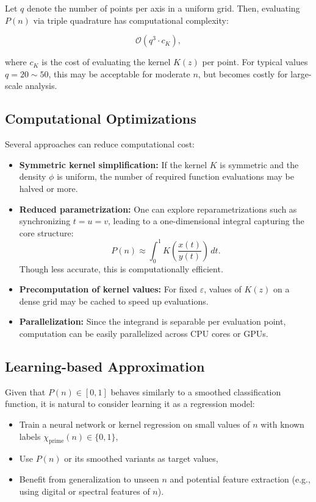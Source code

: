 \documentclass[12pt]{article}
\theoremstyle{definition}
\theoremstyle{plain}
\theoremstyle{remark}
\begin{document}
Let \( q \) denote the number of points per axis in a uniform grid. Then, evaluating \( P(n) \) via triple quadrature has computational complexity:

\[
\mathcal{O}(q^3 \cdot c_K),
\]

where \( c_K \) is the cost of evaluating the kernel \( K(z) \) per point. For typical values \( q = 20 \sim 50 \), this may be acceptable for moderate \( n \), but becomes costly for large-scale analysis.

\subsection{Computational Optimizations}

Several approaches can reduce computational cost:

\begin{itemize}
  \item \textbf{Symmetric kernel simplification:} If the kernel \( K \) is symmetric and the density \( \phi \) is uniform, the number of required function evaluations may be halved or more.
  \item \textbf{Reduced parametrization:} One can explore reparametrizations such as synchronizing \( t = u = v \), leading to a one-dimensional integral capturing the core structure:
  \[
  P(n) \approx \int_0^1 K\left( \frac{x(t)}{y(t)} \right) \, dt.
  \]
  Though less accurate, this is computationally efficient.
  \item \textbf{Precomputation of kernel values:} For fixed \( \varepsilon \), values of \( K(z) \) on a dense grid may be cached to speed up evaluations.
  \item \textbf{Parallelization:} Since the integrand is separable per evaluation point, computation can be easily parallelized across CPU cores or GPUs.
\end{itemize}

\subsection{Learning-based Approximation}

Given that \( P(n) \in [0,1] \) behaves similarly to a smoothed classification function, it is natural to consider learning it as a regression model:

\begin{itemize}
  \item Train a neural network or kernel regression on small values of \( n \) with known labels \( \chi_{\mathrm{prime}}(n) \in \{0,1\} \),
  \item Use \( P(n) \) or its smoothed variants as target values,
  \item Benefit from generalization to unseen \( n \) and potential feature extraction (e.g., using digital or spectral features of \( n \)).
\end{itemize}
\end{document}
